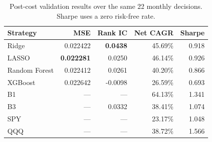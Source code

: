 \begin{table}[H]
\centering
\begin{tabular}{lrrrr}
\toprule
Strategy & MSE & Rank IC & Net CAGR & Sharpe \\
\midrule
Ridge & 0.022422 & \textbf{0.0438} & 45.69\% & 0.918 \\
LASSO & \textbf{0.022281} & 0.0250 & 46.14\% & 0.926 \\
Random Forest & 0.022412 & 0.0261 & 40.20\% & 0.866 \\
XGBoost & 0.022642 & -0.0098 & 26.59\% & 0.693 \\
\midrule
B1 & --- & --- & 64.13\% & 1.341 \\
B3 & --- & 0.0332 & 38.41\% & 1.074 \\
SPY & --- & --- & 23.17\% & 1.048 \\
QQQ & --- & --- & 38.72\% & 1.566 \\
\bottomrule
\end{tabular}
\caption{Post-cost validation results over the same 22 monthly decisions. Sharpe uses a zero risk-free rate.}
\label{tab:validation}
\end{table}
